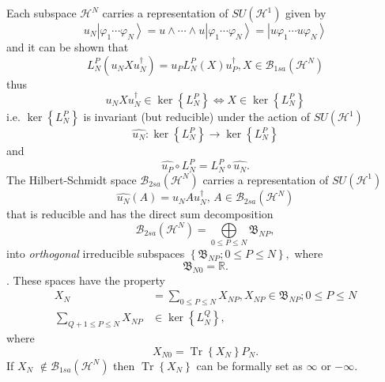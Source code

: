 \documentclass[aps,preprint]{revtex4}%
\begin{document}
Each subspace $\mathcal{H}^{N}$ carries a representation of $SU\left(
\mathcal{H}^{1}\right)  $ given by
\begin{equation}
u_{N}\left\vert \varphi_{1}\cdots\varphi_{N}\right\rangle =u\wedge\cdots\wedge
u\left\vert \varphi_{1}\cdots\varphi_{N}\right\rangle =\left\vert u\varphi
_{1}\cdots u\varphi_{N}\right\rangle
\end{equation}
and it can be shown that
\begin{equation}
L_{N}^{P}\left(  u_{N}Xu_{N}^{\dagger}\right)  =u_{P}L_{N}^{P}\left(
X\right)  u_{P}^{\dagger},X\in\mathcal{B}_{1sa}\left(  \mathcal{H}^{N}\right)
\end{equation}
thus
\begin{equation}
u_{N}Xu_{N}^{\dagger}\in\ker\left\{  L_{N}^{P}\right\}  \Leftrightarrow
X\in\ker\left\{  L_{N}^{P}\right\}
\end{equation}
i.e. $\ker\left\{  L_{N}^{P}\right\}  $ is invariant (but reducible) under the
action of $SU\left(  \mathcal{H}^{1}\right)  $
\begin{equation}
\widehat{u_{N}}:\ker\left\{  L_{N}^{P}\right\}  \rightarrow\ker\left\{
L_{N}^{P}\right\}
\end{equation}
and
\begin{equation}
\widehat{u_{P}}\circ L_{N}^{P}=L_{N}^{P}\circ\widehat{u_{N}}.
\end{equation}
The Hilbert-Schmidt space $\mathcal{B}_{2sa}\left(  \mathcal{H}^{N}\right)  $
carries a representation of $SU\left(  \mathcal{H}^{1}\right)  $
\begin{equation}
\widehat{u_{N}}\left(  A\right)  =u_{N}Au_{N}^{\dagger},\,A\in\mathcal{B}%
_{2sa}\left(  \mathcal{H}^{N}\right)
\end{equation}
that is reducible and has the direct sum decomposition
\begin{equation}
\mathcal{B}_{2sa}\left(  \mathcal{H}^{N}\right)  =%
{\displaystyle\bigoplus\limits_{0\leq P\leq N}}
\mathfrak{B}_{NP},
\end{equation}
into \emph{orthogonal }irreducible subspaces $\left\{  \mathfrak{B}_{NP};0\leq
P\leq N\right\}  ,$ where
\begin{equation}
\mathfrak{B}_{N0}=\mathbb{R}.
\end{equation}
$.$ These spaces have the property
\begin{align}
X_{N}  &  =\sum_{0\leq P\leq N}X_{NP},X_{NP}\in\mathfrak{B}_{NP};0\leq P\leq
N\\
\sum_{Q+1\leq P\leq N}X_{NP}  &  \in\ker\left\{  L_{N}^{Q}\right\}  ,
\end{align}
where
\begin{equation}
X_{N0}=\operatorname*{Tr}\left\{  X_{N}\right\}  P_{N}.
\end{equation}
If $X_{N}$ $\notin\mathcal{B}_{1sa}\left(  \mathcal{H}^{N}\right)  $ then
$\operatorname*{Tr}\left\{  X_{N}\right\}  $ can be formally set as $\infty$
or $-\infty.$
\end{document}
